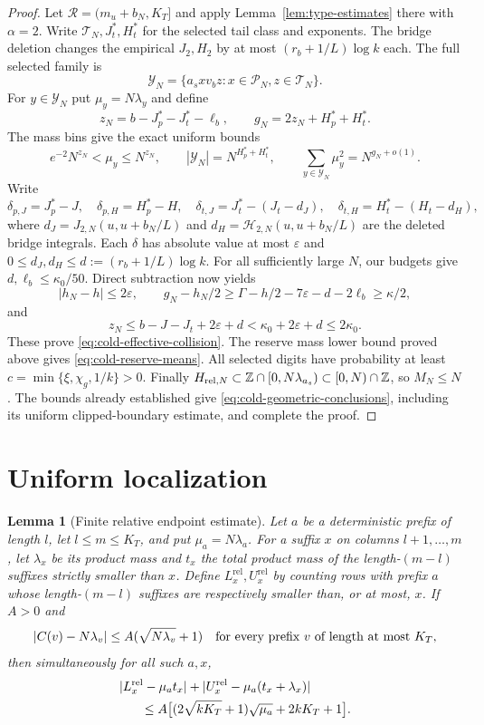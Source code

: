 \documentclass[11pt]{article}
\numberwithin{equation}{section}
\newtheorem{lemma}[lemma]{Lemma}
\newcommand{\1}{\mathbf 1}
\begin{document}
\begin{proof}
Let $\mathcal R=(m_u+b_N,K_T]$ and apply
Lemma~\ref{lem:type-estimates} there with $\alpha=2$.
Write $\mathcal T_N,J_t^*,H_t^*$ for the selected tail class and exponents.
The bridge deletion changes the empirical $J_2,H_2$ by at most
$(r_b+1/L)\log k$ each.
The full selected family is
\[
 \mathcal Y_N=\{a_sxv_bz:x\in\mathcal P_N, z\in\mathcal T_N\}.
\]
For $y\in\mathcal Y_N$ put $\mu_y=N\lambda_y$ and define
\[
 z_N=b-J_p^*-J_t^*-\ell_b,\qquad
 g_N=2z_N+H_p^*+H_t^*.
\]
The mass bins give the exact uniform bounds
\[
 e^{-2}N^{z_N}<\mu_y\le N^{z_N},\qquad
 |\mathcal Y_N|=N^{H_p^*+H_t^*},\qquad
 \sum_{y\in\mathcal Y_N}\mu_y^2=N^{g_N+o(1)}.
\]
Write
\[
 \delta_{p,J}=J_p^*-J,\quad \delta_{p,H}=H_p^*-H,\quad
 \delta_{t,J}=J_t^*-(J_t-d_J),\quad
 \delta_{t,H}=H_t^*-(H_t-d_H),
\]
where $d_J=J_{2,N}(u,u+b_N/L)$ and
$d_H=\mathcal H_{2,N}(u,u+b_N/L)$ are the deleted bridge integrals.
Each $\delta$ has absolute value at most $\varepsilon$ and
$0\le d_J,d_H\le d:=(r_b+1/L)\log k$.
For all sufficiently large $N$, our budgets give
$d,\ell_b\le\kappa_0/50$. Direct subtraction now yields
\[
 |h_N-h|\le2\varepsilon,\qquad
 g_N-h_N/2\ge\Gamma-h/2-7\varepsilon-d-2\ell_b\ge\kappa/2,
\]
and
\[
 z_N\le b-J-J_t+2\varepsilon+d
       <\kappa_0+2\varepsilon+d\le2\kappa_0.
\]
These prove \eqref{eq:cold-effective-collision}. The reserve mass lower
bound proved above gives \eqref{eq:cold-reserve-means}.
All selected digits have probability at least
$c=\min\{\xi,\chi_g,1/k\}>0$. Finally
$H_{{\rm rel},N}\subset\mathbb Z\cap[0,N\lambda_{a_s})\subset[0,N)\cap\mathbb Z$,
so $M_N\le N$. The bounds already established give
\eqref{eq:cold-geometric-conclusions}, including its uniform clipped-boundary
estimate, and complete the proof.
\end{proof}

\section{Uniform localization}

\begin{lemma}[Finite relative endpoint estimate]
\label{lem:finite-relative-endpoints}
Let \(a\) be a deterministic prefix of length \(l\), let
\(l\le m\le K_T\), and put \(\mu_a=N\lambda_a\).
For a suffix \(x\) on columns \(l+1,\ldots,m\), let
\(\lambda_x\) be its product mass and \(t_x\) the total product
mass of the length-\((m-l)\) suffixes strictly smaller than \(x\).
Define \(L_x^{\mathrm{rel}},U_x^{\mathrm{rel}}\) by counting rows
with prefix \(a\) whose length-\((m-l)\) suffixes are respectively
smaller than, or at most, \(x\).
If \(A>0\) and
\[
 |C(v)-N\lambda_v|\le A(\sqrt{N\lambda_v}+1)
 \quad\hbox{for every prefix \(v\) of length at most \(K_T\)},
\]
then simultaneously for all such \(a,x\),
\begin{equation}
\label{eq:relative-endpoint-finite-error}
\begin{split}
 &|L_x^{\mathrm{rel}}-\mu_at_x|
  +|U_x^{\mathrm{rel}}-\mu_a(t_x+\lambda_x)|\\
 &\hspace{6mm}\le
 A\bigl[(2\sqrt{kK_T}+1)\sqrt{\mu_a}+2kK_T+1\bigr].
\end{split}
\end{equation}
\end{lemma}
\end{document}
